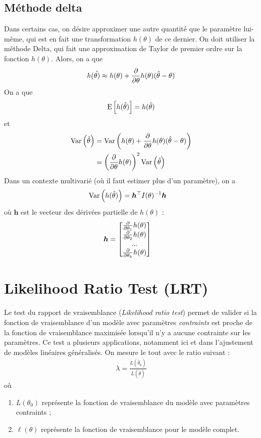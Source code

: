 \documentclass[12pt, french]{report}
\begin{document}
\subsection{Méthode delta}
Dans certains cas, on désire approximer une autre quantité que le paramètre lui-même, qui est en fait une transformation $h(\theta)$ de ce dernier. On doit utiliser la méthode Delta, qui fait une approximation de Taylor de premier ordre sur la fonction $h(\theta)$. Alors, on a que
\begin{align*}
h(\hat{\theta)} \approx h(\theta) + \frac{\partial}{\partial \theta} h(\theta) (\hat{\theta} - \theta)
\end{align*}
On a que
\begin{align*}
\mathrm{E} \left[ h(\hat{\theta}) \right] = h(\hat{\theta})
\end{align*}
et
\begin{align*}
\mathrm{Var} \left( \hat{\theta} \right)	& = \mathrm{Var} \left( h(\theta) +   \frac{\partial}{\partial \theta} h(\theta) (\hat{\theta} - \theta) \right) \\
& = \left( \frac{\partial}{\partial \theta} h(\theta) \right)^2 \mathrm{Var} \left( \hat{\theta} \right) \\
\end{align*}
Dans un contexte multivarié (où il faut estimer plus d'un paramètre), on a
\begin{align*}
\mathrm{Var} \left( h(\hat{\theta}) \right)	& = \bm{h}^{\top} I(\theta)^{-1} \bm{h}
\end{align*}
où $\bm{h}$ est le vecteur des dérivées partielle de $h(\theta)$ : 
\begin{align*}
\bm{h}	& = 
\begin{bmatrix}
\frac{\partial}{\partial \theta_1} h(\theta) \\
\frac{\partial}{\partial \theta_2} h(\theta) \\
... \\
\frac{\partial}{\partial \theta_k} h(\theta) \\
\end{bmatrix}
\end{align*}

\section{Likelihood Ratio Test (LRT)}
Le test du rapport de vraisemblance (\emph{Likelihood ratio test}) permet de valider si la fonction de vraisemblance d'un modèle avec paramètres \emph{contraints} est proche de la fonction de vraisemblance maximisée lorsqu'il n'y a aucune contrainte sur les paramètres. Ce test a plusieurs applications, notamment ici et dans l'ajustement de modèles linéaires généralisés. On mesure le tout avec le ratio suivant : 
\begin{align*}
\lambda = \frac{L(\hat{\theta}_0)}{L(\hat{\theta})}
\end{align*}
où
\begin{enumerate}[label=\faAngleRight]
\item $L(\theta_0)$ représente la fonction de vraisemblance du modèle avec paramètres contraints ;
\item $\ell(\theta)$ représente la fonction de vraisemblance pour le modèle complet.
\end{enumerate}
\end{document}

